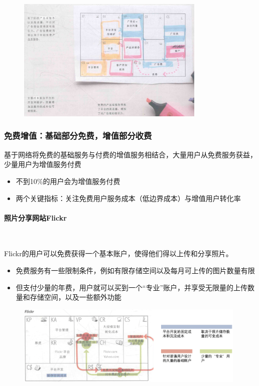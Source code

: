    \begin{figure}[H]
		\centering
        \vspace{-0.5em}
		\includegraphics[width=0.8\textwidth]{img/广告：一个多边平台商业模式.png}
        \vspace{-0.5em}
	\end{figure}

    \subsubsection{免费增值：基础部分免费，增值部分收费}
    基于网络将免费的基础服务与付费的增值服务相结合，大量用户从免费服务获益，少量用户为增值服务付费
    \begin{itemize}
        \item 不到10\%的用户会为增值服务付费
        \item 两个关键指标：关注免费用户服务成本（低边界成本）与增值用户转化率
    \end{itemize}

    \paragraph{照片分享网站Flickr}~{}

    Flickr的用户可以免费获得一个基本账户，使得他们得以上传和分享照片。
    \begin{itemize}
        \item 免费服务有一些限制条件，例如有限存储空间以及每月可上传的图片数量有限
        \item 但支付少量的年费，用户就可以买到一个“专业”账户，并享受无限量的上传数量和存储空间，以及一些额外功能
    \end{itemize}
    \begin{figure}[H]
		\centering
        \vspace{-0.5em}
		\includegraphics[width=0.98\textwidth]{img/Flicker的商业模式.png}
        \vspace{-0.5em}
	\end{figure}

